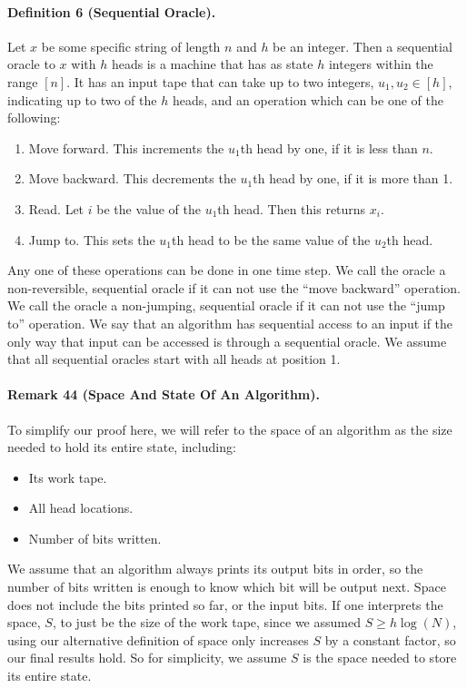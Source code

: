\documentclass[10pt,a4paper]{article}
\begin{document}
\paragraph{Definition 6 (Sequential Oracle).} Let $x$ be some specific string of length $n$ and $h$ be an integer. Then a sequential oracle to $x$ with $h$ heads is a machine that has as state $h$ integers within the range $[n]$. It has an input tape that can take up to two integers, $u_1,u_2\in[h]$, indicating up to two of the $h$ heads, and an operation which can be one of the following:
\begin{enumerate}
\item Move forward. This increments the $u_1$th head by one, if it is less than $n$.
\item Move backward. This decrements the $u_1$th head by one, if it is more than 1.
\item Read. Let $i$ be the value of the $u_1$th head. Then this returns $x_i$.
\item Jump to. This sets the $u_1$th head to be the same value of the $u_2$th head.
\end{enumerate}
Any one of these operations can be done in one time step.
We call the oracle a non-reversible, sequential oracle if it can not use the ``move backward'' operation.
We call the oracle a non-jumping, sequential oracle if it can not use the ``jump to'' operation.
We say that an algorithm has sequential access to an input if the only way that input can be accessed is through a sequential oracle.
We assume that all sequential oracles start with all heads at position 1.
\paragraph{Remark 44 (Space And State Of An Algorithm).} To simplify our proof here, we will refer to the space of an algorithm as the size needed to hold its entire state, including:
\begin{itemize}\item Its work tape.\item All head locations.\item Number of bits written.\end{itemize}
We assume that an algorithm always prints its output bits in order, so the number of bits written is enough to know which bit will be output next. Space does not include the bits printed so far, or the input bits.
If one interprets the space, $S$, to just be the size of the work tape, since we assumed $S\ge h\log(N)$, using our alternative definition of space only increases $S$ by a constant factor, so our final results hold. So for simplicity, we assume $S$ is the space needed to store its entire state.
\end{document}
